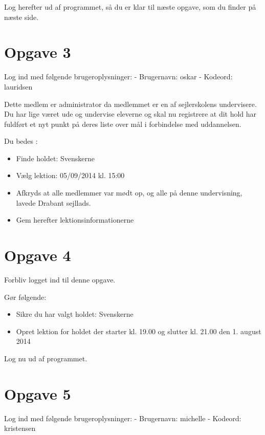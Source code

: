 Log herefter ud af programmet, så du er klar til næste opgave, som du finder på næste side.

\newpage
 
\section{Opgave 3}

Log ind med følgende brugeroplysninger: 
\newline - Brugernavn: oskar
\newline - Kodeord: lauridsen

Dette medlem er administrator da medlemmet er en af sejlerskolens undervisere.
Du har lige været ude og undervise eleverne og skal nu registrere at dit hold har fuldført et nyt punkt på deres liste over mål i forbindelse med uddannelsen.

Du bedes :

\begin{itemize}
\item Finde holdet: Svenskerne
\item Vælg lektion: 05/09/2014 kl. 15:00 
\item Afkryds at alle medlemmer var mødt op, og alle på denne undervisning, lavede Drabant sejllads.
\item Gem herefter lektionsinformationerne
\end{itemize}


\section{Opgave 4}

Forbliv logget ind til denne opgave.

Gør følgende:
\begin{itemize}
\item Sikre du har valgt holdet: Svenskerne
\item Opret lektion for holdet der starter kl. 19.00 og slutter kl. 21.00 den 1. august 2014
\end{itemize}

Log nu ud af programmet.

\section{Opgave 5}

Log ind med følgende brugeroplysninger: 
\newline - Brugernavn: michelle
\newline - Kodeord: kristensen

